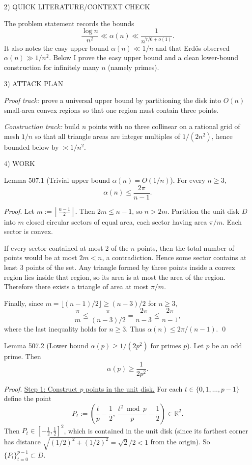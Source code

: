 2) QUICK LITERATURE/CONTEXT CHECK

The problem statement records the bounds
\[\frac{\log n}{n^2}\ll \alpha(n) \ll \frac{1}{n^{7/6+o(1)}}.
\]
It also notes the easy upper bound $\alpha(n)\ll 1/n$ and that Erd\H{o}s observed $\alpha(n)\gg 1/n^2$.
Below I prove the easy upper bound and a clean lower-bound construction for infinitely many $n$ (namely primes).

3) ATTACK PLAN

\emph{Proof track:} prove a universal upper bound by partitioning the disk into $O(n)$ small-area convex regions so that one region must contain three points.

\emph{Construction track:} build $n$ points with no three collinear on a rational grid of mesh $1/n$ so that all triangle areas are integer multiples of $1/(2n^2)$, hence bounded below by $\asymp 1/n^2$.

4) WORK

Lemma 507.1 (Trivial upper bound $\alpha(n)=O(1/n)$).
For every $n\ge 3$,
\[
\alpha(n)\le \frac{2\pi}{n-1}.
\]

\emph{Proof.}
Let $m:=\left\lfloor\frac{n-1}{2}\right\rfloor$.
Then $2m\le n-1$, so $n>2m$.
Partition the unit disk $D$ into $m$ closed circular sectors of equal area, each sector having area $\pi/m$.
Each sector is convex.

If every sector contained at most $2$ of the $n$ points, then the total number of points would be at most $2m<n$, a contradiction.
Hence some sector contains at least $3$ points of the set.
Any triangle formed by three points inside a convex region lies inside that region, so its area is at most the area of the region.
Therefore there exists a triangle of area at most $\pi/m$.

Finally, since $m=\lfloor (n-1)/2\rfloor \ge (n-3)/2$ for $n\ge 3$,
\[
\frac{\pi}{m}\le \frac{\pi}{(n-3)/2}=\frac{2\pi}{n-3}\le \frac{2\pi}{n-1},
\]
where the last inequality holds for $n\ge 3$.
Thus $\alpha(n)\le 2\pi/(n-1)$.
\qed

Lemma 507.2 (Lower bound $\alpha(p)\ge 1/(2p^2)$ for primes $p$).
Let $p$ be an odd prime. Then
\[
\alpha(p)\ge \frac{1}{2p^2}.
\]

\emph{Proof.}
\underline{Step 1: Construct $p$ points in the unit disk.}
For each $t\in\{0,1,\dots,p-1\}$ define the point
\[
P_t:=\left(\frac{t}{p}-\frac12,\ \frac{t^2\bmod p}{p}-\frac12\right)\in\mathbb R^2.
\]
Then $P_t\in[-\tfrac12,\tfrac12]^2$, which is contained in the unit disk (since its farthest corner has distance $\sqrt{(1/2)^2+(1/2)^2}=\sqrt2/2<1$ from the origin).
So $\{P_t\}_{t=0}^{p-1}\subset D$.


